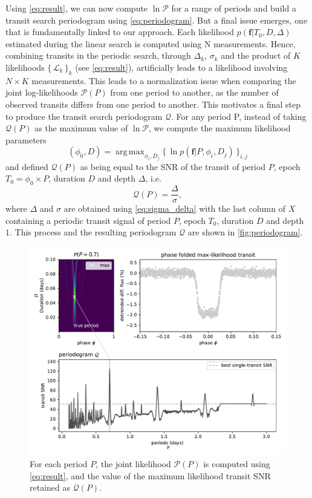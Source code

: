\documentclass[modern]{aastex631}
\newcommand{\set}[1]{\{\,#1\,\}}
\DeclareMathOperator*{\argmax}{arg\,max}
\begin{document}
Using \autoref{eq:result}, we can now compute $\ln\mathcal{P}$ for a range of periods and build a transit search periodogram using \autoref{eq:periodogram}. But a final issue emerges, one that is fundamentally linked to our approach. Each likelihood $p(\bm{f} \vert T_0, D, \Delta)$ estimated during the linear search is computed using N measurements. Hence, combining transits in the periodic search, through $\Delta_k$, $\sigma_k$ and the product of $K$ likelihoods $\set{\mathcal{L}_k}_k$ (see \autoref{eq:result}), artificially leads to a likelihood involving $N\times K$ measurements. This leads to a normalization issue when comparing the joint log-likelihoods $\mathcal{P}(P)$ from one period to another, as the number of observed transits differs from one period to another. This motivates a final step to produce the transit search periodogram $\mathcal{Q}$. For any period P, instead of taking $ \mathcal{Q}(P)$ as the maximum value of $\ln\mathcal{P}$, we compute the maximum likelihood parameters
\begin{equation}\label{eq:phi0}
    (\phi_0 ,D) = \argmax_{\phi_i, D_j} \set{\ln p(\bm{f} \vert P, \phi_i, D_j)}_{i, j}
\end{equation}
and defined $\mathcal{Q}(P)$ as being equal to the SNR of the transit of period $P$, epoch $T_0 = \phi_0 \times P$, duration $D$ and depth $\Delta$, i.e.
\begin{equation*}
    \mathcal{Q}(P) = \frac{\Delta}{\sigma},
\end{equation*}
where $\Delta$ and $\sigma$ are obtained using \autoref{eq:sigma_delta} with the last column of $X$ containing a periodic transit signal of period $P$, epoch $T_0$, duration $D$ and depth $1$. This process and the resulting periodogram $\mathcal{Q}$ are shown in \autoref{fig:periodogram}.
\begin{figure}[H]
    \begin{centering}
        \includegraphics[width=\linewidth]{../workflows/principle/figures/principle_Q.pdf}
        \caption{For each period $P$, the joint likelihood $\mathcal{P}(P)$ is computed using \autoref{eq:result}, and the value of the maximum likelihood transit SNR retained as $\mathcal{Q}(P)$.}
        \label{fig:periodogram}
    \end{centering}
\end{figure}
\end{document}
